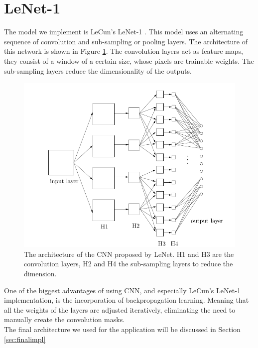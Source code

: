 \documentclass[a4paper,onecolumn]{report}
\begin{document}
\section{LeNet-1}
The model we implement is LeCun's LeNet-1 \cite{lenet}. This model uses an alternating sequence of convolution and sub-sampling or pooling layers. The architecture of this network is shown in Figure \ref{fig:Architecture}. The convolution layers act as feature maps, they consist of a window of a certain size, whose pixels are trainable weights. The sub-sampling layers reduce the dimensionality of the outputs. 
\begin{figure}[h!]
    \centering
    \includegraphics[scale=0.4]{./images/Architecture_CNN.png}
    \caption{The architecture of the CNN proposed by LeNet. H1 and H3 are the convolution layers, H2 and H4 the sub-sampling layers to reduce the dimension. }
	\label{fig:Architecture}
\end{figure}

One of the biggest advantages of using CNN, and especially LeCun's LeNet-1 implementation, is the incorporation of backpropagation learning. Meaning that all the weights of the layers are adjusted iteratively, eliminating the need to manually create the convolution masks.\\

The final architecture we used for the application will be discussed in Section \ref{sec:finalimpl}
\end{document}
